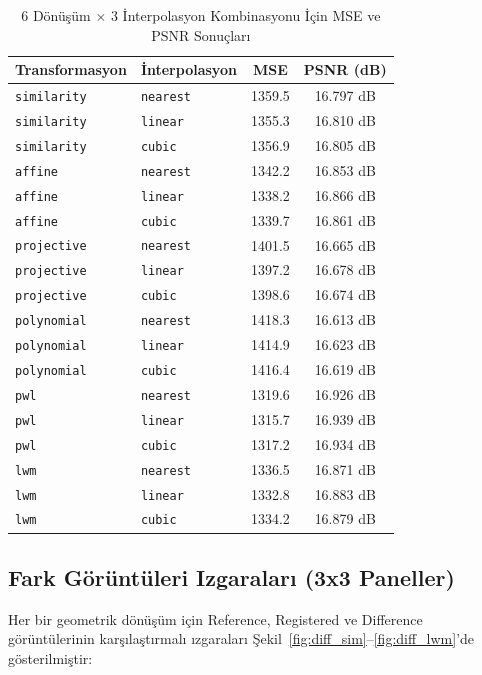 \documentclass[12pt,a4paper]{article}
\begin{document}
\begin{table}[H]
\centering
\caption{6 Dönüşüm $\times$ 3 İnterpolasyon Kombinasyonu İçin MSE ve PSNR Sonuçları}
\label{tab:full_psnr}
\begin{tabular}{llcc}
\toprule
\textbf{Transformasyon} & \textbf{İnterpolasyon} & \textbf{MSE} & \textbf{PSNR (dB)} \\
\midrule
\texttt{similarity} & \texttt{nearest} & 1359.5 & 16.797 dB \\
\texttt{similarity} & \texttt{linear}  & 1355.3 & 16.810 dB \\
\texttt{similarity} & \texttt{cubic}   & 1356.9 & 16.805 dB \\
\midrule
\texttt{affine}     & \texttt{nearest} & 1342.2 & 16.853 dB \\
\texttt{affine}     & \texttt{linear}  & 1338.2 & 16.866 dB \\
\texttt{affine}     & \texttt{cubic}   & 1339.7 & 16.861 dB \\
\midrule
\texttt{projective} & \texttt{nearest} & 1401.5 & 16.665 dB \\
\texttt{projective} & \texttt{linear}  & 1397.2 & 16.678 dB \\
\texttt{projective} & \texttt{cubic}   & 1398.6 & 16.674 dB \\
\midrule
\texttt{polynomial} & \texttt{nearest} & 1418.3 & 16.613 dB \\
\texttt{polynomial} & \texttt{linear}  & 1414.9 & 16.623 dB \\
\texttt{polynomial} & \texttt{cubic}   & 1416.4 & 16.619 dB \\
\midrule
\texttt{pwl}        & \texttt{nearest} & 1319.6 & 16.926 dB \\
\texttt{pwl}        & \texttt{linear}  & 1315.7 & 16.939 dB \\
\texttt{pwl}        & \texttt{cubic}   & 1317.2 & 16.934 dB \\
\midrule
\texttt{lwm}        & \texttt{nearest} & 1336.5 & 16.871 dB \\
\texttt{lwm}        & \texttt{linear}  & 1332.8 & 16.883 dB \\
\texttt{lwm}        & \texttt{cubic}   & 1334.2 & 16.879 dB \\
\bottomrule
\end{tabular}
\end{table}

\newpage
\subsection{Fark Görüntüleri Izgaraları (3x3 Paneller)}
Her bir geometrik dönüşüm için Reference, Registered ve Difference görüntülerinin karşılaştırmalı ızgaraları Şekil~\ref{fig:diff_sim}--\ref{fig:diff_lwm}'de gösterilmiştir:
\end{document}

